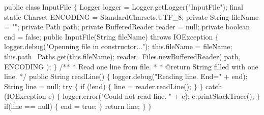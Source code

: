  public class InputFile $\{$\codetexNewline
{} Logger logger = Logger.getLogger("InputFile");\codetexNewline
{} final static Charset ENCODING = StandardCharsets.UTF\_8;\codetexNewline
{} \codetexNewline
{} private String fileName = "";\codetexNewline
{} private Path path;\codetexNewline
{} private BufferedReader reader = null;\codetexNewline
{} private boolean end = false;\codetexNewline
{} \codetexNewline
{} public InputFile(String fileName) throws IOException $\{$\codetexNewline
{} logger.debug("Openning file in constructor...");\codetexNewline
{} this.fileName = fileName;\codetexNewline
{} this.path=Paths.get(this.fileName);\codetexNewline
{} reader=Files.newBufferedReader( path, ENCODING );\codetexNewline
{} $\}$\codetexNewline
{} \codetexNewline
{} /**\codetexNewline
{} * Read one line from file.\codetexNewline
{} *\codetexNewline
{} * @return String filled with one line.\codetexNewline
{} */\codetexNewline
{} public String readLine() $\{$\codetexNewline
{} logger.debug("Reading line. End=" + end);\codetexNewline
{} String line = null;\codetexNewline
{} \codetexNewline
{} try $\{$\codetexNewline
{} if (!end) $\{$\codetexNewline
{} line = reader.readLine();\codetexNewline
{} $\}$\codetexNewline
{} $\}$ catch (IOException e) $\{$\codetexNewline
{} logger.error("Could not read line. " + e);\codetexNewline
{} e.printStackTrace();\codetexNewline
{} $\}$\codetexNewline
{} \codetexNewline
{} if(line == null) $\{$\codetexNewline
{} end = true;\codetexNewline
{} $\}$\codetexNewline
{} \codetexNewline
{} return line;\codetexNewline
{} $\}$\codetexNewline
{} $\}$\codetexNewline

